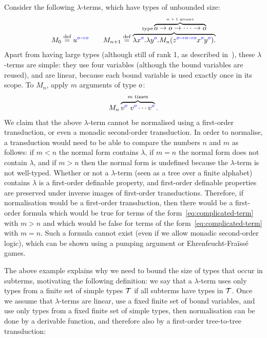 \begin{example}
Consider the following $\lambda$-terms, which have types of unbounded size:     \begin{align*}
        M_0 \stackrel{\text{def}}= {u}^{\color{blue}{o\to o}}  \qquad M_{n+1} \stackrel{\text{def}}= \overbrace{\lambda {x}^{\color{blue}{o}}. \lambda {y}^{\color{blue}{o}}.   M_n ({z}^{\color{blue}{o\to o\to o}}  {x}^{\color{blue}{o}} {y}^{\color{blue}{o}}).}^{\text{type} \overbrace{o \to o \to \cdots \to o}^{\text{$n+1$ arrows}}}
    \end{align*}
    Apart from having large types (although still of rank 1, as described in~\cite[Exercise 3.6.7]{sorensen_lectures_2006}), these  $\lambda$-terms are simple: they use four variables (although the bound variables are reused), and are linear, because each bound variable is used exactly once in its scope. 
    To $M_n$, apply  $m$ arguments of type $o$:
    \begin{align}\label{eq:complicated-term}
    M_n \overbrace{{v}^{\color{blue}{o}} \ {v}^{\color{blue}{o}} \cdots {v}^{\color{blue}{o}} }^{\text{$m$ times}}.
    \end{align}
    We claim that the above $\lambda$-term cannot be normalised using a first-order transduction, or even a monadic second-order transduction. In order to normalise, a transduction would need to be able to compare the numbers $n$ and $m$ as follows:  if $m < n$  the normal form contains $\lambda$, if $m=n$  the normal form does not contain $\lambda$, and if $m > n$ then the normal form is undefined because the $\lambda$-term is not well-typed.  Whether or not a $\lambda$-term (seen as a tree over a finite alphabet) contains $\lambda$ is a first-order definable property, and first-order definable properties are preserved under inverse images of first-order transductions. Therefore, if normalisation would be a first-order transduction,
then there would be a first-order formula which would be true for terms of the form~\eqref{eq:complicated-term} with $m>n$ and which would be false for terms of the form~\eqref{eq:complicated-term} with $m=n$. Such a formula cannot exist (even if we allow monadic second-order logic), which can be shown using a pumping argument or Ehrenfeucht-Fra\"iss\'e games. 
\end{example}

The above example explains why we need to bound the size of types that occur in subterms, motivating the following definition:  we say that a $\lambda$-term uses only types from a finite set of simple types $\mathcal T$ if all  subterms have types in $\mathcal T$.  Once we assume that $\lambda$-terms are linear, use a fixed finite set of bound variables, and use only types from a fixed finite set of simple types, then normalisation can be done by a derivable function, and therefore also by a first-order tree-to-tree transduction: 


